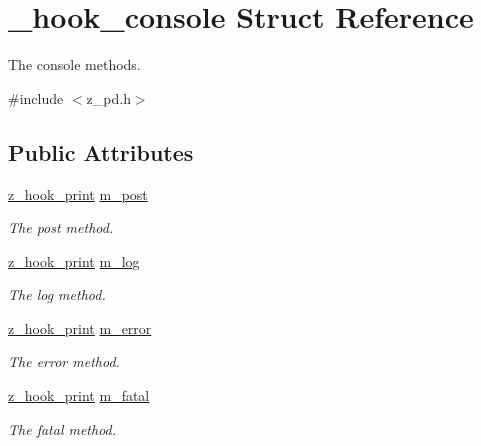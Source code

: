 \hypertarget{struct__hook__console}{\section{\-\_\-hook\-\_\-console Struct Reference}
\label{struct__hook__console}
}


The console methods.  




{\ttfamily \#include $<$z\-\_\-pd.\-h$>$}

\subsection*{Public Attributes}
\begin{DoxyCompactItemize}
\item 
\hypertarget{struct__hook__console_ae2a01afa7c7f823b22f3c31979421c8f}{\hyperlink{group__zpd_ga593812eca293daf504e9e6da49d00a52}{z\-\_\-hook\-\_\-print} \hyperlink{struct__hook__console_ae2a01afa7c7f823b22f3c31979421c8f}{m\-\_\-post}}\label{struct__hook__console_ae2a01afa7c7f823b22f3c31979421c8f}

\begin{DoxyCompactList}\small\item\em The post method. \end{DoxyCompactList}\item 
\hypertarget{struct__hook__console_ace5d0b307458eeb28368d4fbb9ffd59f}{\hyperlink{group__zpd_ga593812eca293daf504e9e6da49d00a52}{z\-\_\-hook\-\_\-print} \hyperlink{struct__hook__console_ace5d0b307458eeb28368d4fbb9ffd59f}{m\-\_\-log}}\label{struct__hook__console_ace5d0b307458eeb28368d4fbb9ffd59f}

\begin{DoxyCompactList}\small\item\em The log method. \end{DoxyCompactList}\item 
\hypertarget{struct__hook__console_a012ab765807c125bb25912b004e60f68}{\hyperlink{group__zpd_ga593812eca293daf504e9e6da49d00a52}{z\-\_\-hook\-\_\-print} \hyperlink{struct__hook__console_a012ab765807c125bb25912b004e60f68}{m\-\_\-error}}\label{struct__hook__console_a012ab765807c125bb25912b004e60f68}

\begin{DoxyCompactList}\small\item\em The error method. \end{DoxyCompactList}\item 
\hypertarget{struct__hook__console_a2c4809268045ab89221300ff4623f135}{\hyperlink{group__zpd_ga593812eca293daf504e9e6da49d00a52}{z\-\_\-hook\-\_\-print} \hyperlink{struct__hook__console_a2c4809268045ab89221300ff4623f135}{m\-\_\-fatal}}\label{struct__hook__console_a2c4809268045ab89221300ff4623f135}

\begin{DoxyCompactList}\small\item\em The fatal method. \end{DoxyCompactList}\end{DoxyCompactItemize}



